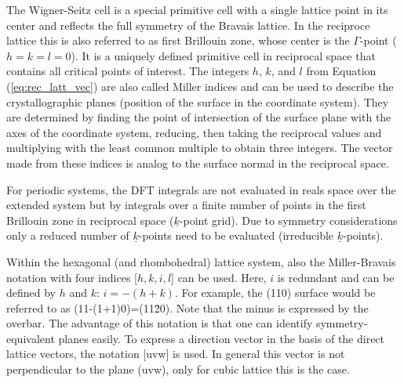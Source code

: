 \documentclass[11pt,DIV=13,BCOR=5mm,a4paper,headinclude]{scrbook}
\renewcommand{\vec}[1]{\underline{#1}}
\begin{document}
The Wigner-Seitz cell is a special primitive cell with a single lattice point in its center and reflects the full symmetry of the Bravais lattice.
In the reciproce lattice this is also referred to as first Brillouin zone, whose center is the $\Gamma$-point ($h=k=l=0$).
It is a uniquely defined primitive cell in reciprocal space that contains all critical points of interest.
The integers $h$, $k$, and $l$ from Equation (\ref{eq:rec_latt_vec}) are also called Miller indices and can be used to describe the crystallographic planes (position of the surface in the coordinate system).
They are determined by finding the point of intersection of the surface plane with the axes of the coordinate system, reducing, then taking the reciprocal values and multiplying with the least common multiple to obtain three integers.
The vector made from these indices is analog to the surface normal in the reciprocal space.


For periodic systems, the DFT integrals are not evaluated in reals space over the extended system but by integrals over a finite number of points in the first Brillouin zone in reciprocal space ($\vec{k}$-point grid).
Due to symmetry considerations only a reduced number of $\vec{k}$-points need to be evaluated (irreducible $\vec{k}$-points).


Within the hexagonal (and rhombohedral) lattice system, also the Miller-Bravais notation with four indices [$h,k,i,l$] can be used.
Here, $i$ is redundant and can be defined by $h$ and $k$: $i=-(h+k)$.
For example, the (110) surface would be referred to as (11-(1+1)0)=(11\=20).
Note that the minus is expressed by the overbar.
The advantage of this notation is that one can identify symmetry-equivalent planes easily.
To express a direction vector in the basis of the direct lattice vectors, the notation [uvw] is used.
In general this vector is not perpendicular to the plane (uvw), only for cubic lattice this is the case.
\end{document}
